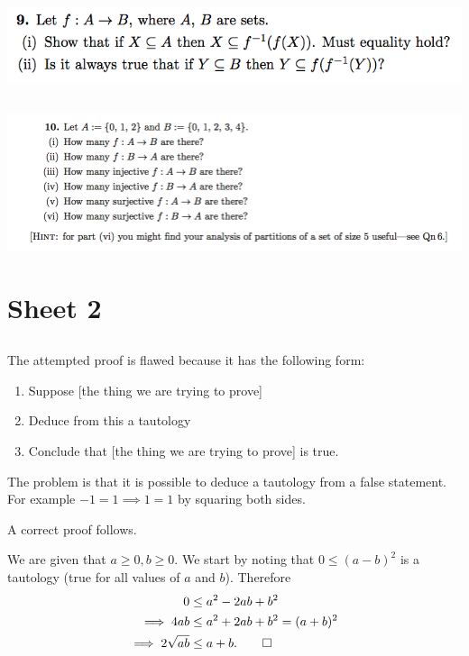 \documentclass[12pt]{article}
\begin{document}
\subsection*{} %
\includegraphics[width=400pt]{img/iulm-1-9.png}
\begin{mdframed}
\end{mdframed}

\subsection*{} %
\includegraphics[width=400pt]{img/iulm-1-10.png}
\begin{mdframed}
\end{mdframed}

\newpage
\section{Sheet 2}
\subsection{}
\begin{mdframed}
  The attempted proof is flawed because it has the following form:
  \begin{enumerate}
  \item Suppose [the thing we are trying to prove]
  \item Deduce from this a tautology
  \item Conclude that [the thing we are trying to prove] is true.
  \end{enumerate}
  The problem is that it is possible to deduce a tautology from a false
  statement. For example $-1 = 1 \implies 1 = 1$ by squaring both sides.

  A correct proof follows.

  We are given that $a \geq 0, b \geq 0$. We start by noting that
  $0 \leq (a - b)^2$ is a tautology (true for all values of $a$ and
  $b$). Therefore
  \begin{align*}
              0 &\leq a^2 -2ab + b^2\\
    \implies  4ab &\leq a^2 + 2ab + b^2 = (a + b)^2\\
    \implies  2\sqrt{ab} &\leq a+b. \qed
  \end{align*}
\end{mdframed}
\end{document}
